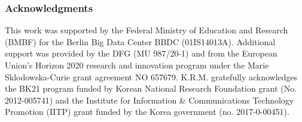 \documentclass{article}
\begin{document}
\subsubsection*{Acknowledgments}
This work was supported by the Federal Ministry of Education and Research (BMBF) for the Berlin Big Data Center BBDC (01IS14013A). Additional support was provided by the DFG (MU 987/20-1) and from the European Union’s Horizon 2020 research and innovation program under the Marie Sklodowska-Curie grant agreement NO 657679. K.R.M. gratefully acknowledges the BK21 program funded by Korean National Research Foundation grant (No. 2012-005741) and the
Institute for Information \& Communications Technology Promotion (IITP) grant funded
by the Korea government (no. 2017-0-00451).





\end{document}
